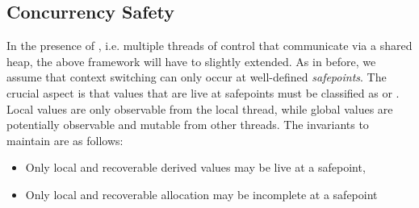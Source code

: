 \subsection{Concurrency Safety}
 In the presence of , i.e. multiple threads
of control that communicate via a shared heap, the above framework
will have to slightly extended.  As in before, we assume that
context switching can only occur at well-defined 
\emph{safepoints}.
The crucial aspect is that values that are live at safepoints must be
classified as  or .
Local values are only observable from
the local thread, while global values are potentially observable and mutable
from other threads.  The invariants to maintain are as follows:
\begin{itemize}
 \item Only local and recoverable derived values may be live at a safepoint,  
 \item Only local and recoverable allocation may be incomplete at a safepoint
\end{itemize}
